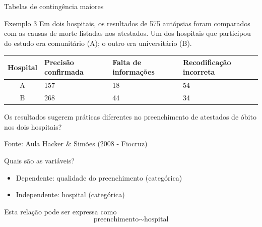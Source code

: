 \documentclass{beamer}
\begin{document}



\begin{frame}{\scriptsize Tabelas de contingência maiores}
  \begin{exampleblock}{Exemplo 3}
    \scriptsize
    Em dois hospitais, os resultados de 575 autópsias
    foram comparados com as causas de morte listadas nos
    atestados. Um dos hospitais que participou do estudo era
    comunitário (A); o outro era universitário (B).

    \bigskip
    \begin{tabular}{c|p{2cm}|p{2cm}|p{2cm}}
      Hospital & Precisão confirmada & Falta de informações &
      Recodificação incorreta \\
      \hline
      A & 157 & 18 & 54 \\
      \hline
      B & 268 & 44 & 34 \\
    \end{tabular}

    \bigskip
    Os resultados sugerem práticas diferentes no preenchimento de
    atestados de óbito nos dois hospitais?
  \end{exampleblock}
  \vfill
  {\hfill \tiny Fonte: Aula Hacker \& Simões (2008 - Fiocruz)}
\end{frame}

\begin{frame}{\scriptsize Quais são as variáveis?}
  \begin{itemize}
    \footnotesize
  \item Dependente: qualidade do preenchimento (categórica)
  \item Independente: hospital (categórica)
  \end{itemize}
  \vfill
  \begin{block}{Esta relação pode ser expressa como}
    \begin{displaymath}
      \text{preenchimento} \sim \text{hospital}
    \end{displaymath}
  \end{block}
\end{frame}
\end{document}
